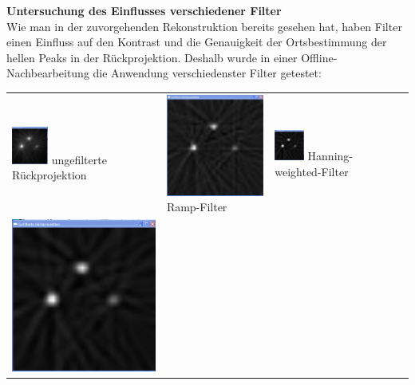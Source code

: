     	            \textbf{Untersuchung des Einflusses verschiedener Filter}\\
    	            
    	            Wie man in der zuvorgehenden Rekonstruktion bereits gesehen hat, haben Filter einen Einfluss auf den Kontrast und die Genauigkeit der Ortsbestimmung der hellen Peaks in der Rückprojektion. Deshalb wurde in einer Offline-Nachbearbeitung die Anwendung verschiedenster Filter getestet:
    	            \begin{center}
    	              \begin{longtable}{p{4.0cm}p{4.0cm}p{4.0cm}l}
    	                  \includegraphics[width=0.25\textwidth, height=0.15\textheight]{pic/Einzelfenster_Bilder/unbekannte_Quelle/unbek5_einf_prj.png}
    	                  ungefilterte Rückprojektion
    	                  & 
    	                  \includegraphics[width=.25\textwidth, height=0.15\textheight]{pic/Einzelfenster_Bilder/unbekannte_Quelle/unbek5_ramp.png}
    	                  Ramp-Filter
    	                  &
    	                  \includegraphics[width=0.25\textwidth, height=0.15\textheight]{pic/Einzelfenster_Bilder/unbekannte_Quelle/unbek5_hanning_weighted.png}
    	                  Hanning-weighted-Filter\\
    	                  \includegraphics[width=.25\textwidth, height=0.15\textheight]{pic/Einzelfenster_Bilder/unbekannte_Quelle/unbek5_middle.png} 

\end{longtable}
\end{center}
